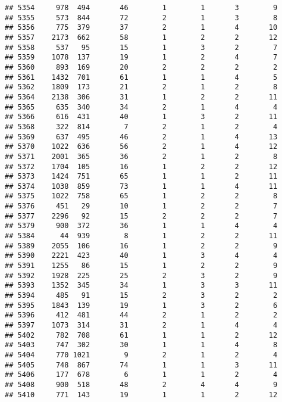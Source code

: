 \documentclass[]{article}
\begin{document}
\begin{verbatim}
## 5354     978  494       46        1        1       3        9
## 5355     573  844       72        2        1       3        8
## 5356     775  379       37        2        1       4       10
## 5357    2173  662       58        1        2       2       12
## 5358     537   95       15        1        3       2        7
## 5359    1078  137       19        1        2       4        7
## 5360     893  169       20        2        2       2        2
## 5361    1432  701       61        1        1       4        5
## 5362    1809  173       21        2        1       2        8
## 5364    2138  306       31        1        2       2       11
## 5365     635  340       34        2        1       4        4
## 5366     616  431       40        1        3       2       11
## 5368     322  814        7        2        1       2        4
## 5369     637  495       46        2        1       4       13
## 5370    1022  636       56        2        1       4       12
## 5371    2001  365       36        2        1       2        8
## 5372    1704  105       16        1        2       2       12
## 5373    1424  751       65        1        1       2       11
## 5374    1038  859       73        1        1       4       11
## 5375    1022  758       65        1        2       2        8
## 5376     451   29       10        1        2       2        7
## 5377    2296   92       15        2        2       2        7
## 5379     900  372       36        1        1       4        4
## 5384      44  939        8        1        2       2       11
## 5389    2055  106       16        1        2       2        9
## 5390    2221  423       40        1        3       4        4
## 5391    1255   86       15        1        2       2        9
## 5392    1928  225       25        2        3       2        9
## 5393    1352  345       34        1        3       3       11
## 5394     485   91       15        2        3       2        2
## 5395    1843  139       19        1        3       2        6
## 5396     412  481       44        2        1       2        2
## 5397    1073  314       31        2        1       4        4
## 5402     782  708       61        1        1       2       12
## 5403     747  302       30        1        1       4        8
## 5404     770 1021        9        2        1       2        4
## 5405     748  867       74        1        1       3       11
## 5406     177  678        6        1        1       2        4
## 5408     900  518       48        2        4       4        9
## 5410     771  143       19        1        1       2       12

\end{verbatim}
\end{document}
